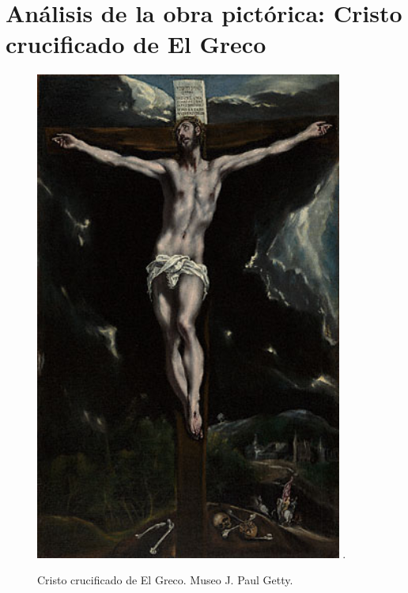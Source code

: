 \section{Análisis de la obra pictórica: Cristo crucificado de El Greco}

\begin{figure}[ht!]
    \centering
    \includegraphics[width=0.9\textwidth]{elgreco.jpg}
   .\caption{Cristo crucificado de El Greco. Museo J. Paul Getty.} %
\end{figure}

\newpage




